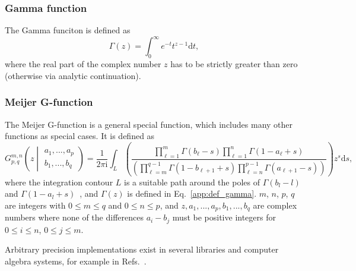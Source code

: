 \subsubsection*{Gamma function}
The Gamma funciton is defined as~\cite[Eq.~5.2.1]{NIST:DLMF}
\begin{equation}
\label{app:def_gamma}
\Gamma\left(z\right)=\int_{0}^{\infty}e^{-t}t^{z-1}\mathrm{d}t,
\end{equation}
where the real part of the complex number $z$ has to be strictly greater than zero (otherwise via analytic continuation).
\subsubsection*{Meijer G-function}
The Meijer G-function is a general special function, which includes many other functions as special cases. It is defined as
\begin{equation}
\label{app:def_meijerG}
G^{m,n}_{p,q}\left(z\middle|
\begin{matrix}
a_1,...,a_p\\
b_1,...,b_q
\end{matrix}
\right)
=
\frac{1}{2\pi\mathrm{i}}\int_{L%
}\left({\textstyle\frac{\prod\limits_{\ell=1}^{m}\Gamma\left(b_{\ell}-s\right%
)\prod\limits_{\ell=1}^{n}\Gamma\left(1-a_{\ell}+s\right)}{\left(\prod\limits_%
{\ell=m}^{q-1}\Gamma\left(1-b_{\ell+1}+s\right)\prod\limits_{\ell=n}^{p-1}%
\Gamma\left(a_{\ell+1}-s\right)\right)}}\right)z^{s}\mathrm{d}s,
\end{equation}
where the integration contour $L$ is a suitable path around the poles of $\Gamma(b_l-l)$ and \mbox{$\Gamma(1-a_l+s)$}~\cite[Eq.~16.17.1]{NIST:DLMF}, and $\Gamma(z)$ is defined in Eq.~\eqref{app:def_gamma}. $m$, $n$, $p$, $q$ are integers with $0 \leq m \leq q$ and $0 \leq n \leq p$, and $z,a_1,...,a_p,b_1,...,b_q$ are complex numbers where none of the differences $a_i-b_j$ must be positive integers for $0\leq i \leq n$, $0\leq j \leq m$.

Arbitrary precision implementations exist in several libraries and computer algebra systems, for example in Refs.~\cite{mpmath,Mathematica}.

